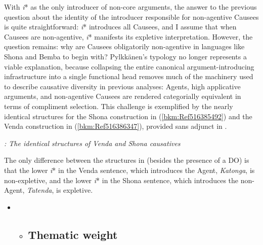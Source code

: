 \documentclass[output=paper,modfonts,nonflat]{langsci/langscibook}
\begin{document}
With \textit{i}* as the only introducer of non-core arguments, the answer to the previous question about the identity of the introducer responsible for non-agentive Causees is quite straightforward: \textit{i}* introduces all Causees, and I assume that when Causees are non-agentive, \textit{i}* manifests its expletive interpretation. However, the question remains: why are Causees obligatorily non-agentive in languages like Shona and Bemba to begin with? Pylkkänen’s typology no longer represents a viable explanation, because collapsing the entire canonical argument-introducing infrastructure into a single functional head removes much of the machinery used to describe causative diversity in previous analyses: Agents, high applicative arguments, and non-agentive Causees are rendered categorially equivalent in terms of compliment selection. This challenge is exemplified by the nearly identical structures for the Shona construction in (\ref{bkm:Ref516385492}) and the Venda construction in (\ref{bkm:Ref516386347}), provided sans adjunct in . 



  
   
 



\textit{: The identical structures of Venda and Shona causatives} 



The only difference between the structures in  (besides the presence of a DO) is that the lower \textit{i}* in the Venda sentence, which introduces the Agent, \textit{Katonga}, is non-expletive, and the lower \textit{i}* in the Shona sentence, which introduces the non-Agent, \textit{Tatenda}, is expletive. 


\begin{itemize}
\item \begin{itemize}
\item \subsection{Thematic weight} 
\end{itemize}
\end{itemize}
\end{document}
